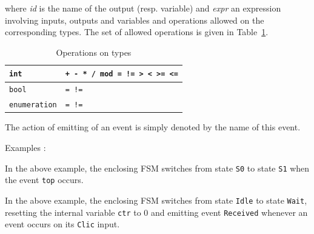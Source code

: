 \begin{center}
\end{center}

where \emph{id} is the name of the output (resp. variable) and \emph{expr} an expression involving
inputs, outputs and variables and operations allowed on the corresponding types. The set of allowed
operations is given in Table~\ref{tab:type-ops}.

\begin{table}
\begin{minipage}[c]{1.0\linewidth}
\small
\begin{center}
\begin{tabular}{|l|l|} \hline
{\tt int}       & {\tt + - * / mod = != > < >= <=} \\  \hline
{\tt bool}      & {\tt = !=} \\ \hline 
{\tt enumeration}     & {\tt = !=} \\  \hline
\end{tabular}
\caption{Operations on types}
\label{tab:type-ops}
\end{center}
\end{minipage}
\end{table}

\medskip
The action of emitting of an event  is simply denoted by the name of this event.

\medskip
Examples :

\begin{center}
\end{center}

In the above example, the enclosing FSM switches from state \verb|S0| to state \verb|S1| when the
event \verb|top| occurs. 

\begin{center}
\end{center}

In the above example, the enclosing FSM switches from state \verb|Idle| to state \verb|Wait|, resetting the internal variable
  \verb|ctr| to 0 and emitting event \verb|Received| whenever an event occurs on its \verb|Clic| input.

\begin{center}
\end{center}

